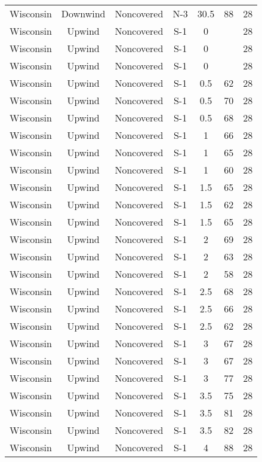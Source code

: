 \documentclass{article}
\begin{document}
\begin{longtable}[H]{ccccccc}
Wisconsin & Downwind & Noncovered & N-3 & 30.5 & 88  & 28 \\
Wisconsin & Upwind   & Noncovered & S-1 & 0    &     & 28 \\
Wisconsin & Upwind   & Noncovered & S-1 & 0    &     & 28 \\
Wisconsin & Upwind   & Noncovered & S-1 & 0    &     & 28 \\
Wisconsin & Upwind   & Noncovered & S-1 & 0.5  & 62  & 28 \\
Wisconsin & Upwind   & Noncovered & S-1 & 0.5  & 70  & 28 \\
Wisconsin & Upwind   & Noncovered & S-1 & 0.5  & 68  & 28 \\
Wisconsin & Upwind   & Noncovered & S-1 & 1    & 66  & 28 \\
Wisconsin & Upwind   & Noncovered & S-1 & 1    & 65  & 28 \\
Wisconsin & Upwind   & Noncovered & S-1 & 1    & 60  & 28 \\
Wisconsin & Upwind   & Noncovered & S-1 & 1.5  & 65  & 28 \\
Wisconsin & Upwind   & Noncovered & S-1 & 1.5  & 62  & 28 \\
Wisconsin & Upwind   & Noncovered & S-1 & 1.5  & 65  & 28 \\
Wisconsin & Upwind   & Noncovered & S-1 & 2    & 69  & 28 \\
Wisconsin & Upwind   & Noncovered & S-1 & 2    & 63  & 28 \\
Wisconsin & Upwind   & Noncovered & S-1 & 2    & 58  & 28 \\
Wisconsin & Upwind   & Noncovered & S-1 & 2.5  & 68  & 28 \\
Wisconsin & Upwind   & Noncovered & S-1 & 2.5  & 66  & 28 \\
Wisconsin & Upwind   & Noncovered & S-1 & 2.5  & 62  & 28 \\
Wisconsin & Upwind   & Noncovered & S-1 & 3    & 67  & 28 \\
Wisconsin & Upwind   & Noncovered & S-1 & 3    & 67  & 28 \\
Wisconsin & Upwind   & Noncovered & S-1 & 3    & 77  & 28 \\
Wisconsin & Upwind   & Noncovered & S-1 & 3.5  & 75  & 28 \\
Wisconsin & Upwind   & Noncovered & S-1 & 3.5  & 81  & 28 \\
Wisconsin & Upwind   & Noncovered & S-1 & 3.5  & 82  & 28 \\
Wisconsin & Upwind   & Noncovered & S-1 & 4    & 88  & 28 \\

\end{longtable}
\end{document}
